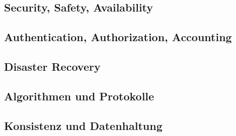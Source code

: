 \documentclass[letterpaper, 12pt]{article}
\let\tempsubsection\subsection
\renewcommand\subsection[1]{\vspace{0cm}\tempsubsection{#1}\vspace{0cm}}
\begin{document}


\subsection{Security, Safety, Availability}

\subsection{Authentication, Authorization, Accounting}

\subsection{Disaster Recovery}

\subsection{Algorithmen und Protokolle}

\subsection{Konsistenz und Datenhaltung}

\clearpage


\end{document}
